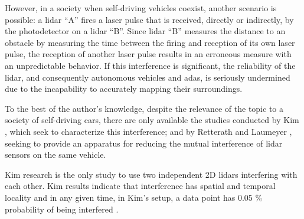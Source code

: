 However, in a society when self-driving vehicles coexist, another scenario is possible: a \ac{lidar} ``A'' fires a laser pulse that is received, directly or indirectly, by the photodetector on a \ac{lidar} ``B''. Since \ac{lidar} ``B'' measures the distance to an obstacle by measuring the time between the firing and reception of its own laser pulse, the reception of another laser pulse results in an erroneous measure with an unpredictable behavior. If this interference is significant, the reliability of the \ac{lidar}, and consequently autonomous vehicles and \ac{adas}, is seriously undermined due to the incapability to accurately mapping their surroundings.

To the best of the author's knowledge, despite the relevance of the topic to a society of self-driving cars, there are only available the studies conducted by Kim \etal \cite{Kim2017, Kim2015}, which seek to characterize this interference; and by Retterath and Laumeyer \cite{Al.2013}, seeking to provide an apparatus for reducing the mutual interference of \ac{lidar} sensors on the same vehicle.


Kim \etal research %
is the only study to use two independent 2D \ac{lidar}s interfering with each other. Kim \etal results indicate that interference has spatial and temporal locality \cite{Kim2015} and in any given time, in Kim's setup, a data point has 0.05 \% probability of being interfered \cite{Kim2015}.



